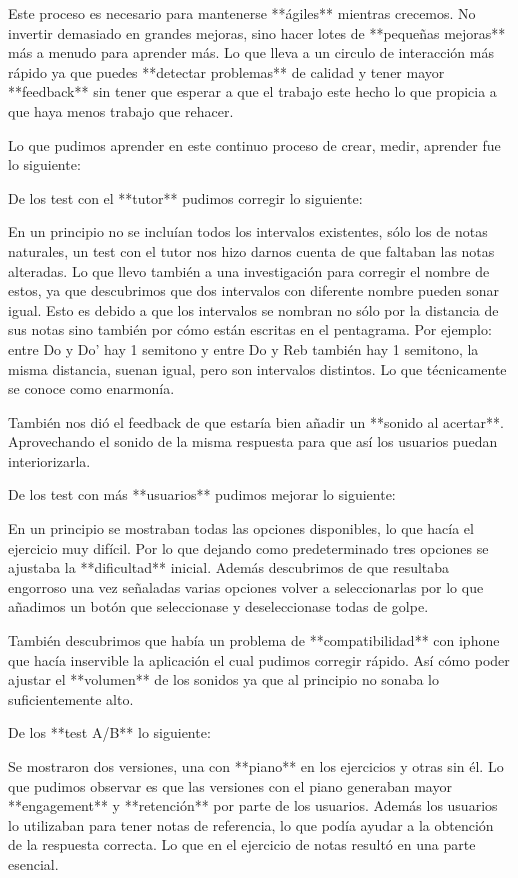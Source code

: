 \documentclass[12pt,twoside,titlepage]{report}
\begin{document}
{Este proceso es necesario para mantenerse **ágiles** mientras crecemos. No invertir demasiado en grandes mejoras, sino hacer lotes de **pequeñas mejoras** más a menudo para aprender más. Lo que lleva a un circulo de interacción más rápido ya que puedes **detectar problemas** de calidad y tener mayor **feedback** sin tener que esperar a que el trabajo este hecho lo que propicia a que haya menos trabajo que rehacer.

Lo que pudimos aprender en este continuo proceso de crear, medir, aprender fue lo siguiente:

De los test con el **tutor** pudimos corregir lo siguiente:

En un principio no se incluían todos los intervalos existentes, sólo los de notas naturales, un test con el tutor nos hizo darnos cuenta de que faltaban las notas alteradas. Lo que llevo también a una investigación para corregir el nombre de estos, ya que descubrimos que dos intervalos con diferente nombre pueden sonar igual. Esto es debido a que los intervalos se nombran no sólo por la distancia de sus notas sino también por cómo están escritas en el pentagrama. Por ejemplo: entre Do y Do' hay 1 semitono y entre Do y Reb también hay 1 semitono, la misma distancia, suenan igual, pero son intervalos distintos. Lo que técnicamente se conoce como enarmonía.

También nos dió el feedback de que estaría bien añadir un **sonido al acertar**. Aprovechando el sonido de la misma respuesta para que así los usuarios puedan interiorizarla.

De los test con más **usuarios** pudimos mejorar lo siguiente:

En un principio se mostraban todas las opciones disponibles, lo que hacía el ejercicio muy difícil. Por lo que dejando como predeterminado tres opciones se ajustaba la **dificultad** inicial. Además descubrimos de que resultaba engorroso una vez señaladas varias opciones volver a seleccionarlas por lo que añadimos un botón que seleccionase y deseleccionase todas de golpe.

También descubrimos que había un problema de **compatibilidad** con iphone que hacía inservible la aplicación el cual pudimos corregir rápido. Así cómo poder ajustar el **volumen** de los sonidos ya que al principio no sonaba lo suficientemente alto.

De los **test A/B** lo siguiente:

Se mostraron dos versiones, una con **piano** en los ejercicios y otras sin él. Lo que pudimos observar es que las versiones con el piano generaban mayor **engagement** y **retención** por parte de los usuarios. Además los usuarios lo utilizaban para tener notas de referencia, lo que podía ayudar a la obtención de la respuesta correcta. Lo que en el ejercicio de notas resultó en una parte esencial.

}
\end{document}
